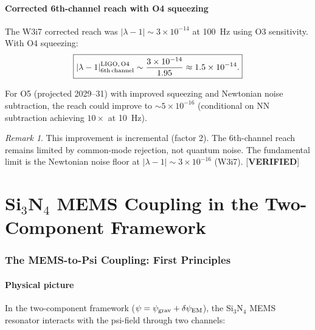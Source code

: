 \documentclass[11pt]{article}
\newcommand{\lam}{\lambda}
\newcommand{\ee}[1]{\times 10^{#1}}
\newcommand{\lbone}{|\lam - 1|}
\newcommand{\psigrav}{\psi_{\rm grav}}
\newcommand{\dpsiEM}{\delta\psi_{\rm EM}}
\theoremstyle{definition}
\theoremstyle{remark}
\newtheorem{remark}[theorem]{Remark}
\begin{document}
\subsection{Corrected 6th-channel reach with O4 squeezing}

The W3i7 corrected reach was $\lbone \sim 3\ee{-14}$ at 100~Hz using
O3 sensitivity. With O4 squeezing:
\begin{equation}
\boxed{
\lbone^{\rm LIGO,\,O4}_{\rm 6th\,channel}
\sim \frac{3\ee{-14}}{1.95} \approx 1.5\ee{-14}.
}
\label{eq:ligo_O4}
\end{equation}

For O5 (projected 2029--31) with improved squeezing and Newtonian
noise subtraction, the reach could improve to $\sim 5\ee{-16}$
(conditional on NN subtraction achieving $10\times$ at 10~Hz).

\begin{remark}
This improvement is incremental (factor 2). The 6th-channel reach
remains limited by common-mode rejection, not quantum noise.
The fundamental limit is the Newtonian noise floor at
$\lbone \sim 3\ee{-16}$ (W3i7). [\textbf{VERIFIED}]
\end{remark}


\part{Si$_3$N$_4$ MEMS Coupling in the Two-Component Framework}
\label{part:MEMS}

\section{The MEMS-to-Psi Coupling: First Principles}
\label{sec:mems_coupling}

\subsection{Physical picture}

In the two-component framework ($\psi = \psigrav + \dpsiEM$), the
Si$_3$N$_4$ MEMS resonator interacts with the psi-field through two
channels:
\end{document}
